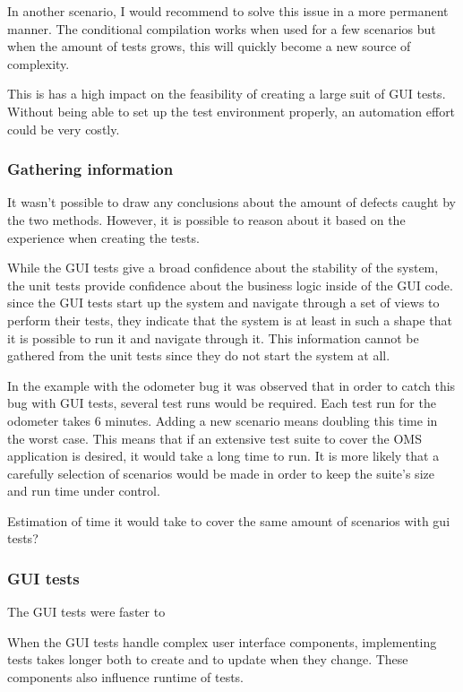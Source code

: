 \documentclass{article}
\begin{document}
			In another scenario, I would recommend to solve this issue in a more permanent manner. The conditional compilation works when used for a few scenarios but when the amount of tests grows, this will quickly become a new source of complexity.

			This is has a high impact on the feasibility of creating a large suit of GUI tests. Without being able to set up the test environment properly, an automation effort could be very costly.

			\subsubsection{Gathering information}
			It wasn't possible to draw any conclusions about the amount of defects caught by the two methods. However, it is possible to reason about it based on the experience when creating the tests. 

			While the GUI tests give a broad confidence about the stability of the system, the unit tests provide confidence about the business logic inside of the GUI code. since the GUI tests start up the system and navigate through a set of views to perform their tests, they indicate that the system is at least in such a shape that it is possible to run it and navigate through it. This information cannot be gathered from the unit tests since they do not start the system at all. 

			In the example with the odometer bug it was observed that in order to catch this bug with GUI tests, several test runs would be required. Each test run for the odometer takes 6 minutes. Adding a new scenario means doubling this time in the worst case. This means that if an extensive test suite to cover the OMS application is desired, it would take a long time to run. It is more likely that a carefully selection of scenarios would be made in order to keep the suite's size and run time under control.  
			
			Estimation of time it would take to cover the same amount of scenarios with gui tests?

			\subsubsection{GUI tests}
			The GUI tests were faster to 

			When the GUI tests handle complex user interface components, implementing tests takes longer both to create and to update when they change. These components also influence runtime of tests.
\end{document}
